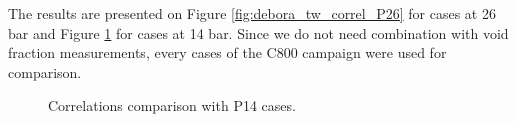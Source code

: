 \npar

The results are presented on Figure \ref{fig:debora_tw_correl_P26} for cases at 26 bar and Figure \ref{fig:debora_tw_correl_P14} for cases at 14 bar. Since we do not need combination with void fraction measurements, every cases of the C800 campaign were used for comparison.


\begin{figure}[h!]
\centering

\caption{Correlations comparison with P14 cases.}
\label{fig:debora_tw_correl_P14}
\end{figure}



